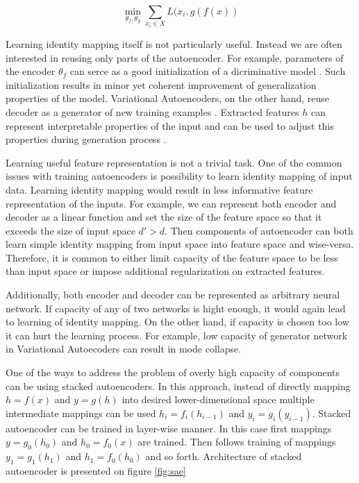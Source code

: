 \begin{equation}\label{eq:ae}
\min_{\theta_f, \theta_g}\sum\limits_{x_i \in X}{L(x_i, g(f(x))}
\end{equation}

Learning identity mapping itself is not particularly useful.
Instead we are often interested in reusing only parts of the autoencoder.
For example, parameters of the encoder $\theta_f$ can serce as a good initialization of a dicriminative model \cite{Masci2011, Vincent2010, Zhao2015}.
Such initialization results in minor yet coherent improvement of generalization properties of the model.
Variational Autoencoders, on the other hand, reuse decoder as a generator of new training examples \cite{Kingma2013}.
Extracted features $h$ can represent interpretable properties of the input and can be used to adjust this
properties during generation process \cite{Kulkarni2015, Whitney2016}.

Learning useful feature representation is not a trivial task.
One of the common issues with training autoencoders is possibility to learn identity mapping of input data.
Learning identity mapping would result in less informative feature representation of the inputs.
For example, we can represent both encoder and decoder as a linear function and set the size of the feature space so that it exceeds the size of input space $d' > d$.
Then components of autoencoder can both learn simple identity mapping from input space into feature space and wise-versa.
Therefore, it is common to either limit capacity of the feature space to be less than input space or impose additional regularization on extracted features.

Additionally, both encoder and decoder can be represented as arbitrary neural network.
If capacity of any of two networks is hight enough, it would again lead to learning of identity mapping.
On the other hand, if capacity is chosen too low it can hurt the learning process.
For example, low capacity of generator network in Variational Autoecoders can result in mode collapse.

One of the ways to address the problem of overly high capacity of components can be using stacked autoencoders.
In this approach, instead of directly mapping $h=f(x)$ and $y=g(h)$ into desired lower-dimensional space multiple intermediate mappings can be used $h_i=f_i(h_{i-1})$ and $y_i=g_i(y_{i-1})$.
Stacked autoencoder can be trained in layer-wise manner.
In this case first mappings $y=g_0(h_0)$ and $h_0=f_0(x)$ are trained.
Then follows training of mappings $y_1=g_1(h_1)$ and $h_1=f_0(h_0)$ and so forth.
Architecture of stacked autoencoder is presented on figure \ref{fig:sae}

